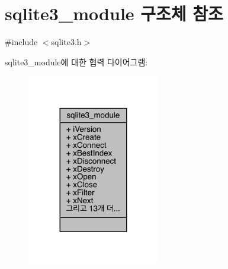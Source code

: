 \hypertarget{structsqlite3__module}{}\section{sqlite3\+\_\+module 구조체 참조}
\label{structsqlite3__module}


{\ttfamily \#include $<$sqlite3.\+h$>$}



sqlite3\+\_\+module에 대한 협력 다이어그램\+:
\nopagebreak
\begin{figure}[H]
\begin{center}
\leavevmode
\includegraphics[width=164pt]{structsqlite3__module__coll__graph}
\end{center}
\end{figure}
